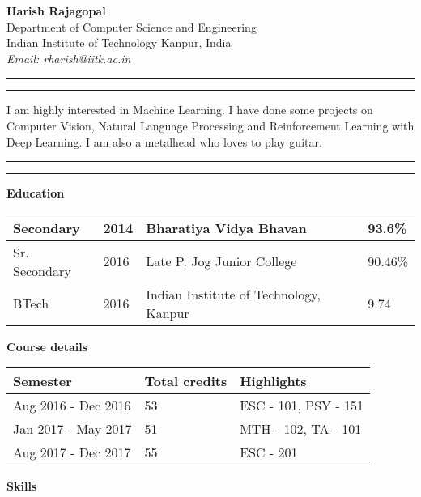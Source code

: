 \documentclass{article}
\begin{document}
    \hspace{-5mm}\textbf{Harish Rajagopal}\\
    Department of Computer Science and Engineering\\
    Indian Institute of Technology Kanpur, India\\
    \textit{Email: rharish@iitk.ac.in}\\[0.75mm]

    \hrule
    \vspace{1mm}
    \hrule
    \vspace{2mm}
    I am highly interested in Machine Learning. I have done some projects on Computer Vision, Natural Language Processing and Reinforcement Learning with Deep Learning. I am also a metalhead who loves to play guitar.\\[-2.5mm]
    \hrule
    \vspace{1mm}
    \hrule
    \vspace{2mm}

    \textbf{Education}\\[-0.4mm]

    \begin{tabular}{| l | l | l | l |}
        \hline
        Secondary & 2014 & Bharatiya Vidya Bhavan & 93.6\%\\
        \hline
        Sr. Secondary & 2016 & Late P. Jog Junior College & 90.46\%\\
        \hline
        BTech & 2016 & Indian Institute of Technology, Kanpur & 9.74\\
        \hline
    \end{tabular}
    \vspace{5.75mm}

    \textbf{Course details}\\[-0.4mm]

    \begin{tabular}{| l | l | l |}
        \hline
        \textbf{Semester} & \textbf{Total credits} & \textbf{Highlights}\\
        \hline
        Aug 2016 - Dec 2016 & 53 & ESC - 101, PSY - 151\\
        \hline
        Jan 2017 - May 2017& 51 & MTH - 102, TA - 101\\
        \hline
        Aug 2017 - Dec 2017 & 55 & ESC - 201\\
        \hline
    \end{tabular}
    \vspace{8mm}

    \textbf{Skills}\\
\end{document}

